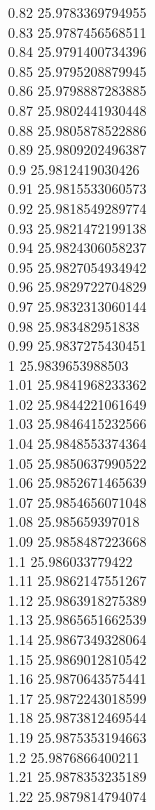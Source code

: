 {0.82	25.9783369794955\\
0.83	25.9787456568511\\
0.84	25.9791400734396\\
0.85	25.9795208879945\\
0.86	25.9798887283885\\
0.87	25.9802441930448\\
0.88	25.9805878522886\\
0.89	25.9809202496387\\
0.9	25.9812419030426\\
0.91	25.9815533060573\\
0.92	25.9818549289774\\
0.93	25.9821472199138\\
0.94	25.9824306058237\\
0.95	25.9827054934942\\
0.96	25.9829722704829\\
0.97	25.9832313060144\\
0.98	25.983482951838\\
0.99	25.9837275430451\\
1	25.9839653988503\\
1.01	25.9841968233362\\
1.02	25.9844221061649\\
1.03	25.9846415232566\\
1.04	25.9848553374364\\
1.05	25.9850637990522\\
1.06	25.9852671465639\\
1.07	25.9854656071048\\
1.08	25.985659397018\\
1.09	25.9858487223668\\
1.1	25.986033779422\\
1.11	25.9862147551267\\
1.12	25.9863918275389\\
1.13	25.9865651662539\\
1.14	25.9867349328064\\
1.15	25.9869012810542\\
1.16	25.9870643575441\\
1.17	25.9872243018599\\
1.18	25.9873812469544\\
1.19	25.9875353194663\\
1.2	25.9876866400211\\
1.21	25.9878353235189\\
1.22	25.9879814794074\\
}
